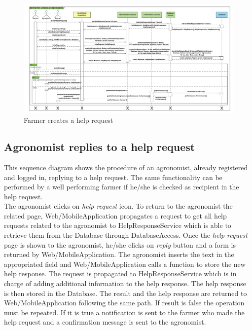 \newpage
\begin{landscape}
\begin{figure}[h]
\vspace*{-2cm}
\noindent
\centering
\centerline{\includegraphics[scale= 0.108]{./Images/Sequence diagram/Farmer creates a help request.png}}
    \caption{Farmer creates a help request}
    \vspace*{-12cm}
\end{figure}
\fillandplacepagenumber
\end{landscape}

\subsection{Agronomist replies to a help request}

This sequence diagram shows the procedure of an agronomist, already registered and logged in, replying to a help request. The same functionality can be performed by a well performing farmer if he/she is checked as recipient in the help request.\\
The agronomist clicks on \textit{help request} icon. To return to the agronomist the related page, Web/MobileApplication propagates a request to get all help requests related to the agronomist to HelpResponseService which is able to retrieve them from the Database through DatabaseAccess. 
Once the \textit{help request} page is shown to the agronomist, he/she clicks on \textit{reply} button and a form is returned by Web/MobileApplication. The agronomist inserts the text in the appropriated field and Web/MobileApplication calls a function to store the new help response. The request is propagated to HelpResponseService which is in charge of  adding additional information to the help response. The help response is then stored in the Database. The result and the help response are returned to Web/MobileApplication following the same path. If result is false the operation must be repeated. If it is true a notification is sent to the farmer who made the help request and a confirmation message is sent to the agronomist.

